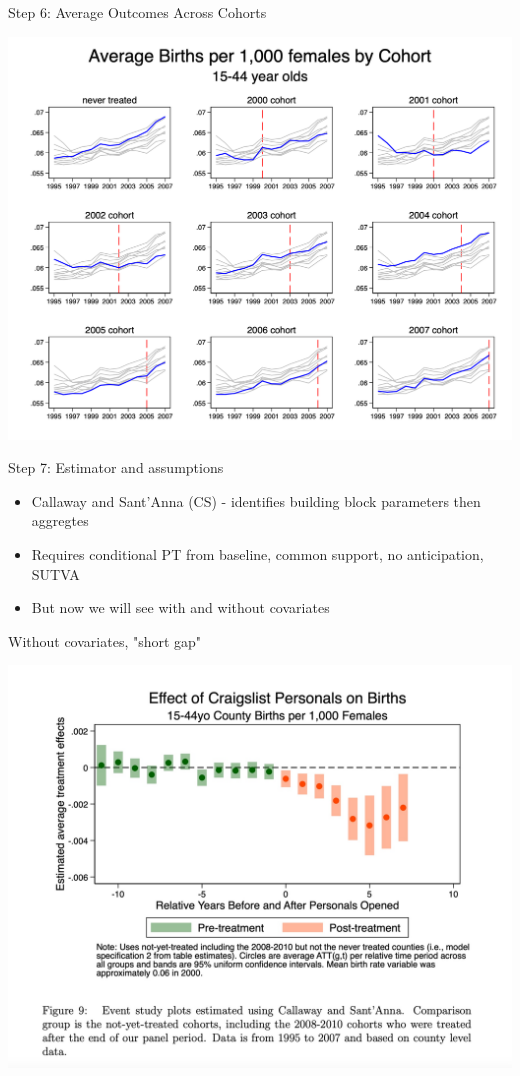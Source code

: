 \documentclass{beamer}
\begin{document}
\begin{frame}{Step 6: Average Outcomes Across Cohorts}

    \begin{center}
        \includegraphics[width=0.75\linewidth,keepaspectratio]{./lecture_includes/pretty_outcomes.png}
    \end{center}
\end{frame}


\begin{frame}{Step 7: Estimator and assumptions}

\begin{itemize}
\item Callaway and Sant'Anna (CS) - identifies building block parameters then aggregtes
\item Requires conditional PT from baseline, common support, no anticipation, SUTVA
\item But now we will see with and without covariates

\end{itemize}

\end{frame}

\begin{frame}{Without covariates, "short gap"}


    \begin{center}
        \includegraphics[width=0.75\linewidth,keepaspectratio]{./lecture_includes/es_births_shortgapNC.jpg}
    \end{center}
\end{frame}
\end{document}
